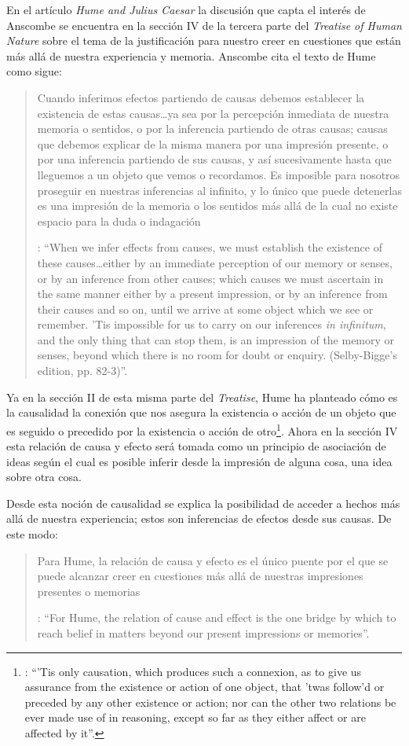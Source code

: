 En el artículo \emph{Hume and Julius Caesar} la discusión que capta el interés de Anscombe se encuentra en la sección IV de la tercera parte del \emph{Treatise of Human Nature} sobre el tema de la justificación para nuestro creer en cuestiones que están más allá de nuestra experiencia y memoria. Anscombe cita el texto de Hume como sigue: \blockquote[{\Cite[86]{anscombe1981parmenides:humeandjulius}}: \enquote{When we infer effects from causes, we must establish the existence of these causes\ldots either by an immediate perception of our memory or senses, or by an inference from other causes; which causes we must ascertain in the same manner either by a present impression, or by an inference from their causes and so on, until we arrive at some object which we see or remember. 'Tis impossible for us to carry on our inferences \emph{in infinitum}, and the only thing that can stop them, is an impression of the memory or senses, beyond which there is no room for doubt or enquiry. (Selby-Bigge's edition, pp. 82-3)}.]{Cuando inferimos efectos partiendo de causas debemos establecer la existencia de estas causas\ldots ya sea por la percepción inmediata de nuestra memoria o sentidos, o por la inferencia partiendo de otras causas; causas que debemos explicar de la misma manera por una impresión presente, o por una inferencia partiendo de sus causas, y así sucesivamente hasta que lleguemos a un objeto que vemos o recordamos. Es imposible para nosotros proseguir en nuestras inferencias al infinito, y lo único que puede detenerlas es una impresión de la memoria o los sentidos más allá de la cual no existe espacio para la duda o indagación}.

Ya en la sección II de esta misma parte del \emph{Treatise}, Hume ha planteado cómo es la causalidad la conexión que nos asegura la existencia o acción de un objeto que es seguido o precedido por la existencia o acción de otro\footnote{\cite[Cf.][53]{hume1740treatise}: \enquote{’Tis only causation, which produces such a connexion, as to give us assurance from the existence or action of one object, that ’twas follow’d or preceded by any other existence or action; nor can the other two relations be ever made use of in reasoning, except so far as they either affect or are affected by it}.}. Ahora en la sección IV esta relación de causa y efecto será tomada como un principio de asociación de ideas según el cual es posible inferir desde la impresión de alguna cosa, una idea sobre otra cosa.

Desde esta noción de causalidad se explica la posibilidad de acceder a hechos más allá de nuestra experiencia; estos son inferencias de efectos desde sus causas. De este modo: \blockquote[{\Cite[87]{anscombe1981parmenides:humeandjulius}}: \enquote{For Hume, the relation of cause and effect is the one bridge by which to reach belief in matters beyond our present impressions or memories}.]{Para Hume, la relación de causa y efecto es el único puente por el que se puede alcanzar creer en cuestiones más allá de nuestras impresiones presentes o memorias}.

